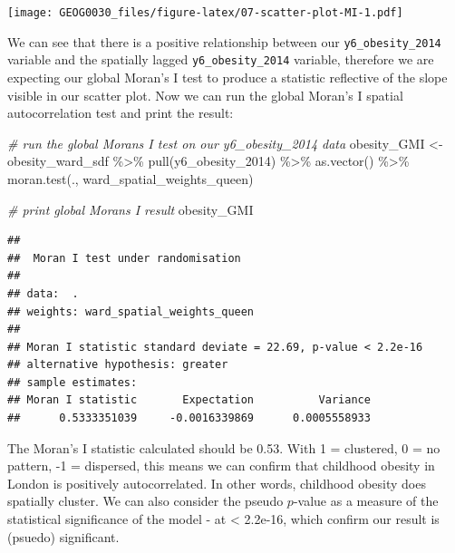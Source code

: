 \documentclass[
]{book}
\newenvironment{Shaded}{\begin{snugshade}}{\end{snugshade}}
\newcommand{\AttributeTok}[1]{\textcolor[rgb]{0.77,0.63,0.00}{#1}}
\newcommand{\CommentTok}[1]{\textcolor[rgb]{0.56,0.35,0.01}{\textit{#1}}}
\newcommand{\FunctionTok}[1]{\textcolor[rgb]{0.00,0.00,0.00}{#1}}
\newcommand{\NormalTok}[1]{#1}
\newcommand{\OtherTok}[1]{\textcolor[rgb]{0.56,0.35,0.01}{#1}}
\newcommand{\SpecialCharTok}[1]{\textcolor[rgb]{0.00,0.00,0.00}{#1}}
\begin{document}
\begin{Shaded}
\end{Shaded}

\texttt{[image: GEOG0030\_files/figure-latex/07-scatter-plot-MI-1.pdf]}

We can see that there is a positive relationship between our \texttt{y6\_obesity\_2014} variable and the spatially lagged \texttt{y6\_obesity\_2014} variable, therefore we are expecting our global Moran's I test to produce a statistic reflective of the slope visible in our scatter plot. Now we can run the global Moran's I spatial autocorrelation test and print the result:

\begin{Shaded}
\begin{Highlighting}[]
\CommentTok{\# run the global Moran\textquotesingle{}s I test on our y6\_obesity\_2014 data}
\NormalTok{obesity\_GMI }\OtherTok{\textless{}{-}}\NormalTok{ obesity\_ward\_sdf }\SpecialCharTok{\%\textgreater{}\%}
    \FunctionTok{pull}\NormalTok{(y6\_obesity\_2014) }\SpecialCharTok{\%\textgreater{}\%}
    \FunctionTok{as.vector}\NormalTok{() }\SpecialCharTok{\%\textgreater{}\%}
    \FunctionTok{moran.test}\NormalTok{(., ward\_spatial\_weights\_queen)}

\CommentTok{\# print global Moran\textquotesingle{}s I result}
\NormalTok{obesity\_GMI}
\end{Highlighting}
\end{Shaded}

\begin{verbatim}
## 
##  Moran I test under randomisation
## 
## data:  .  
## weights: ward_spatial_weights_queen    
## 
## Moran I statistic standard deviate = 22.69, p-value < 2.2e-16
## alternative hypothesis: greater
## sample estimates:
## Moran I statistic       Expectation          Variance 
##      0.5333351039     -0.0016339869      0.0005558933
\end{verbatim}

The Moran's I statistic calculated should be 0.53. With 1 = clustered, 0 = no pattern, -1 = dispersed, this means we can confirm that childhood obesity in London is positively autocorrelated. In other words, childhood obesity does spatially cluster. We can also consider the pseudo \(p\)-value as a measure of the statistical significance of the model - at \textless{} 2.2e-16, which confirm our result is (psuedo) significant.
\end{document}
